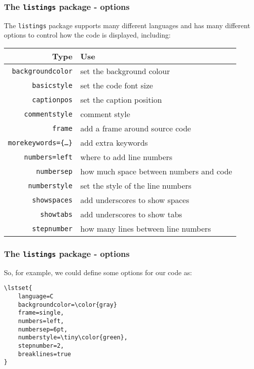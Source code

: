 \documentclass[mathserif]{beamer}
\begin{document}
\begin{frame}[fragile]
\frametitle{The \texttt{listings} package - options}
\vfill
The \texttt{listings} package supports many different languages and has many different options to control how the code is displayed, including:
\vfill
\begin{center}
	\begin{tabular}{r | l }
		Type & Use \\
		\hline
		\texttt{backgroundcolor} & set the background colour \\
		\texttt{basicstyle} & set the code font size \\
		\texttt{captionpos} & set the caption position \\
		\texttt{commentstyle} & comment style \\
		\texttt{frame} & add a frame around source code \\		
		\texttt{morekeywords=\{\ldots\}} & add extra keywords \\
		\texttt{numbers=left} & where to add line numbers \\
		\texttt{numbersep} & how much space between numbers and code \\
		\texttt{numberstyle} & set the style of the line numbers \\		
		\texttt{showspaces} & add underscores to show spaces \\
		\texttt{showtabs} & add underscores to show tabs \\
		\texttt{stepnumber} & how many lines between line numbers \\		
	\end{tabular}
\end{center}
\vfill
\end{frame}


\begin{frame}[fragile]
\frametitle{The \texttt{listings} package - options}
\vfill
So, for example, we could define some options for our code as:
\vfill
\begin{lstlisting}[style=latexsty]
\lstset{
    language=C
    backgroundcolor=\color{gray}
    frame=single,
    numbers=left,
    numbersep=6pt,
    numberstyle=\tiny\color{green},
    stepnumber=2,
    breaklines=true
}
\end{lstlisting}
\end{frame}
\end{document}
